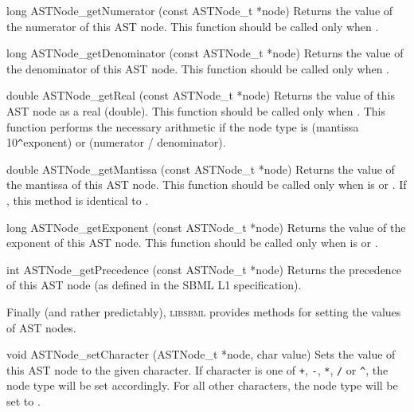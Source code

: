 \documentclass{sbmlmanual}
\newcommand{\libsbml}{\textsc{libsbml}}
\begin{document}
\begin{methoddef}{long ASTNode\_getNumerator (const ASTNode\_t *node)}
  Returns the value of the numerator of this AST node.  This function
  should be called only when .
\end{methoddef}


\begin{methoddef}{long ASTNode\_getDenominator (const ASTNode\_t *node)}
  Returns the value of the denominator of this AST node.  This function
  should be called only when .
\end{methoddef}


\begin{methoddef}{double ASTNode\_getReal (const ASTNode\_t *node)}
  Returns the value of this AST node as a real (double).  This function
  should be called only when .
  This function performs the necessary arithmetic if the node type is
   (mantissa  10\verb|^|exponent) or 
  (numerator / denominator).
\end{methoddef}


\begin{methoddef}{double ASTNode\_getMantissa (const ASTNode\_t *node)}
  Returns the value of the mantissa of this AST node.  This function should
  be called only when  is 
  or .  If , this method is identical to
  .
\end{methoddef}


\begin{methoddef}{long ASTNode\_getExponent (const ASTNode\_t *node)}
  Returns the value of the exponent of this AST node.  This function should
  be called only when  is 
  or .
\end{methoddef}


\begin{methoddef}{int ASTNode\_getPrecedence (const ASTNode\_t *node)}
  Returns the precedence of this AST node (as defined in the SBML L1
  specification).
\end{methoddef}


Finally (and rather predictably), \libsbml{} provides methods for setting
the values of AST nodes.


\begin{methoddef}{void ASTNode\_setCharacter (ASTNode\_t *node, char value)}
  Sets the value of this AST node to the given character.  If character is
  one of \verb|+|, \verb|-|, \verb|*|, \verb|/| or \verb|^|, the node type
  will be set accordingly.  For all other characters, the node type will be
  set to .
\end{methoddef}
\end{document}
